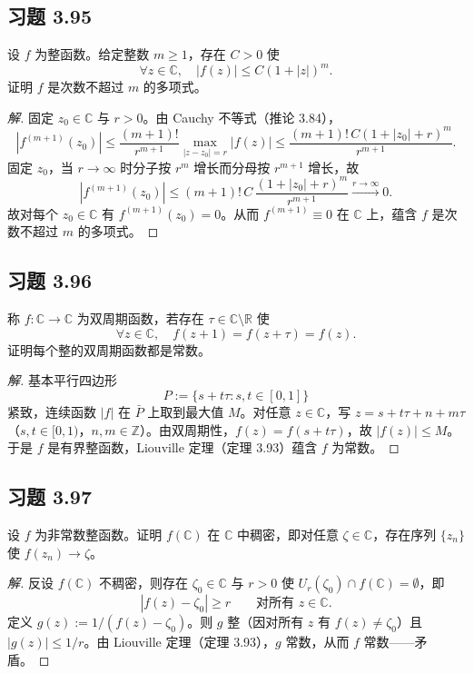 \documentclass[11pt,a4paper]{article}
\newcommand{\R}{\mathbb{R}}
\newcommand{\C}{\mathbb{C}}
\newcommand{\Z}{\mathbb{Z}}
\theoremstyle{definition}
\newenvironment{solution}{\begin{proof}[解]}{\end{proof}}
\begin{document}
\subsection{习题 3.95}

设 $f$ 为整函数。给定整数 $m \ge 1$，存在 $C > 0$ 使
\[
  \forall z \in \C,\quad |f(z)| \le C(1 + |z|)^m.
\]
证明 $f$ 是次数不超过 $m$ 的多项式。

\begin{solution}
  固定 $z_0 \in \C$ 与 $r > 0$。由 Cauchy 不等式（推论 3.84），
  \[
    |f^{(m+1)}(z_0)|
    \le \frac{(m+1)!}{r^{m+1}}\max_{|z-z_0|=r}|f(z)|
    \le \frac{(m+1)!\,C(1+|z_0|+r)^m}{r^{m+1}}.
  \]
  固定 $z_0$，当 $r \to \infty$ 时分子按 $r^m$ 增长而分母按 $r^{m+1}$ 增长，故
  \[
    |f^{(m+1)}(z_0)|
    \le (m+1)!\,C\,\frac{(1+|z_0|+r)^m}{r^{m+1}}
    \xrightarrow{r\to\infty}0.
  \]
  故对每个 $z_0 \in \C$ 有 $f^{(m+1)}(z_0) = 0$。从而 $f^{(m+1)} \equiv 0$ 在 $\C$ 上，蕴含 $f$ 是次数不超过 $m$ 的多项式。\qedhere
\end{solution}

\subsection{习题 3.96}

称 $f : \C \to \C$ 为双周期函数，若存在 $\tau \in \C \setminus \R$ 使
\[
  \forall z \in \C,\quad f(z + 1) = f(z + \tau) = f(z).
\]
证明每个整的双周期函数都是常数。

\begin{solution}
  基本平行四边形
  \[
    P := \{s + t\tau : s,t \in [0,1]\}
  \]
  紧致，连续函数 $|f|$ 在 $\bar{P}$ 上取到最大值 $M$。对任意 $z \in \C$，写 $z = s + t\tau + n + m\tau$（$s,t \in [0,1)$，$n,m \in \Z$）。由双周期性，$f(z) = f(s + t\tau)$，故 $|f(z)| \le M$。于是 $f$ 是有界整函数，Liouville 定理（定理 3.93）蕴含 $f$ 为常数。\qedhere
\end{solution}

\subsection{习题 3.97}

设 $f$ 为非常数整函数。证明 $f(\C)$ 在 $\C$ 中稠密，即对任意 $\zeta \in \C$，存在序列 $\{z_n\}$ 使 $f(z_n) \to \zeta$。

\begin{solution}
  反设 $f(\C)$ 不稠密，则存在 $\zeta_0 \in \C$ 与 $r > 0$ 使 $U_r(\zeta_0) \cap f(\C) = \emptyset$，即
  \[
    |f(z) - \zeta_0| \ge r \qquad \text{对所有 } z \in \C.
  \]
  定义 $g(z) := 1/(f(z) - \zeta_0)$。则 $g$ 整（因对所有 $z$ 有 $f(z) \ne \zeta_0$）且 $|g(z)| \le 1/r$。由 Liouville 定理（定理 3.93），$g$ 常数，从而 $f$ 常数——矛盾。\qedhere
\end{solution}
\end{document}
